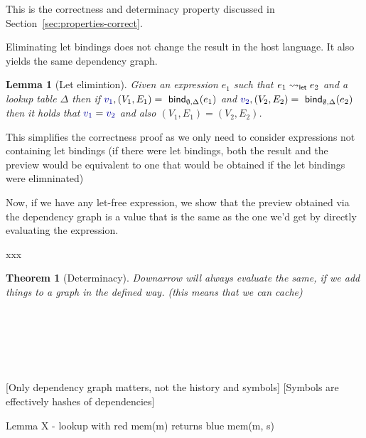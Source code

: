 \documentclass[sigplan,10pt]{acmart}\settopmatter{printfolios=true,printccs=false,printacmref=false}
\newcounter{thc}
\theoremstyle{plain}
\newtheorem{lem}[thc]{Lemma}
\newtheorem{theorem}[thc]{Theorem}
\theoremstyle{definition}
\newcommand{\ident}[1]{\textnormal{\sffamily #1}}
\newcommand{\bndclr}[1]{\textcolor{kvdclr}{#1}}
\begin{document}
This is the correctness and determinacy property discussed in Section~\ref{sec:properties-correct}.

Eliminating let bindings does not change the result in the host language. It also yields the same
dependency graph.

\begin{lem}[Let elimintion]
Given an expression $e_1$ such that $e_1 \rightsquigarrow_\ident{let} e_2$ and a lookup table $\Delta$
then if $\bndclr{v_1}, (V_1, E_1) = \ident{bind}_{\emptyset, \Delta}(e_1)$ and  
$\bndclr{v_2}, (V_2, E_2) = \ident{bind}_{\emptyset, \Delta}(e_2)$ then it holds that
$\bndclr{v_1} = \bndclr{v_2}$ and also $(V_1, E_1) = (V_2, E_2)$.
\end{lem}

This simplifies the correctness proof as we only need to consider expressions not containing
let bindings (if there were let bindings, both the result and the preview would be equivalent
to one that would be obtained if the let bindings were elimninated)

Now, if we have any let-free expression, we show that the preview obtained via the dependency graph
is a value that is the same as the one we'd get by directly evaluating the expression.

xxx

\begin{theorem}[Determinacy]
\label{thm:determinacy}
Downarrow will always evaluate the same, if we add things to a graph in the defined way.
(this means that we can cache)
\end{theorem}


~

~

~

[Only dependency graph matters, not the history and symbols]
[Symbols are effectively hashes of dependencies]

\begin{lemma}
\label{thm:lemma-lookup}
Lemma X - lookup with red mem(m) returns blue mem(m, s)
\end{lemma}
\end{document}
